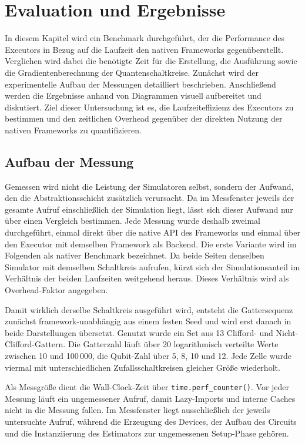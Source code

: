 \chapter{Evaluation und Ergebnisse}
\label{chap:benchmark}
In diesem Kapitel wird ein Benchmark durchgeführt, der die Performance des Executors in Bezug auf die Laufzeit den nativen Frameworks gegenüberstellt. Verglichen wird dabei die benötigte Zeit für die Erstellung, die Ausführung sowie die Gradientenberechnung der Quantenschaltkreise. Zunächst wird der experimentelle Aufbau der Messungen detailliert beschrieben. Anschließend werden die Ergebnisse anhand von Diagrammen visuell aufbereitet und diskutiert. Ziel dieser Untersuchung ist es, die Laufzeiteffizienz des Executors zu bestimmen und den zeitlichen Overhead gegenüber der direkten Nutzung der nativen Frameworks zu quantifizieren.

\section{Aufbau der Messung}
\label{sec:benchmark-aufbau}

Gemessen wird nicht die Leistung der Simulatoren selbst, sondern der Aufwand, den
die Abstraktionsschicht zusätzlich verursacht. Da im Messfenster jeweils der
gesamte Aufruf einschließlich der Simulation liegt, lässt sich dieser Aufwand nur
über einen Vergleich bestimmen. Jede Messung wurde deshalb zweimal durchgeführt,
einmal direkt über die native API des Frameworks und einmal über den Executor mit
demselben Framework als Backend. Die erste Variante wird im Folgenden als
nativer Benchmark bezeichnet. Da beide Seiten denselben Simulator mit demselben
Schaltkreis aufrufen, kürzt sich der Simulationsanteil im Verhältnis der beiden
Laufzeiten weitgehend heraus. Dieses Verhältnis wird als Overhead-Faktor angegeben.

Damit wirklich derselbe Schaltkreis ausgeführt wird, entsteht die Gattersequenz
zunächst framework-unabhängig aus einem festen Seed und wird erst danach in beide
Darstellungen übersetzt. Genutzt wurde ein Set aus 13 Clifford- und
Nicht-Clifford-Gattern. Die Gatterzahl läuft über 20 logarithmisch verteilte Werte
zwischen 10 und 100\,000, die Qubit-Zahl über 5, 8, 10 und 12. Jede Zelle wurde
viermal mit unterschiedlichen Zufallsschaltkreisen gleicher Größe wiederholt.

Als Messgröße dient die Wall-Clock-Zeit über \texttt{time.perf\_counter()}. Vor
jeder Messung läuft ein ungemessener Aufruf, damit Lazy-Imports und interne Caches
nicht in die Messung fallen. Im Messfenster liegt ausschließlich der jeweils
untersuchte Aufruf, während die Erzeugung des Devices, der Aufbau des Circuits und
die Instanziierung des Estimators zur ungemessenen Setup-Phase gehören.

